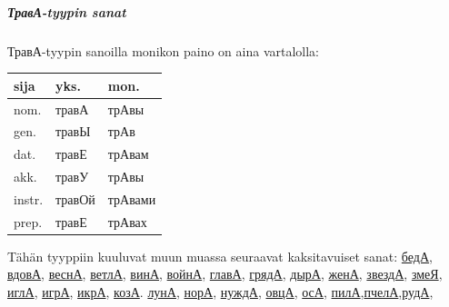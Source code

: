\documentclass[]{scrreprt}
\begin{document}
\subparagraph{ТравА-tyypin
sanat}\label{ux442ux440ux430ux432ux430-tyypin-sanat}

ТравА-tyypin sanoilla monikon paino on aina vartalolla:

\begin{longtable}[c]{@{}lll@{}}
\toprule
sija & yks. & mon.\tabularnewline
\midrule
\endhead
nom. & травА & трАвы\tabularnewline
gen. & травЫ & трАв\tabularnewline
dat. & травЕ & трАвам\tabularnewline
akk. & травУ & трАвы\tabularnewline
instr. & травОй & трАвами\tabularnewline
prep. & травЕ & трАвах\tabularnewline
\bottomrule
\end{longtable}

Tähän tyyppiin kuuluvat muun muassa seuraavat kaksitavuiset sanat:
\href{http://ru.wiktionary.org/wiki/\%D0\%B1\%D0\%B5\%D0\%B4\%D0\%B0}{бедА},
\href{http://ru.wiktionary.org/wiki/\%D0\%B2\%D0\%B4\%D0\%BE\%D0\%B2\%D0\%B0}{вдовА},
\href{http://ru.wiktionary.org/wiki/\%D0\%B2\%D0\%B5\%D1\%81\%D0\%BD\%D0\%B0}{веснА},
\href{http://ru.wiktionary.org/wiki/\%D0\%B2\%D0\%B5\%D1\%82\%D0\%BB\%D0\%B0}{ветлА},
\href{http://ru.wiktionary.org/wiki/\%D0\%B2\%D0\%B8\%D0\%BD\%D0\%B0}{винА},
\href{http://ru.wiktionary.org/wiki/\%D0\%B2\%D0\%BE\%D0\%B9\%D0\%BD\%D0\%B0}{войнА},
\href{http://ru.wiktionary.org/wiki/\%D0\%B3\%D0\%BB\%D0\%B0\%D0\%B2\%D0\%B0}{главА},
\href{http://ru.wiktionary.org/wiki/\%D0\%B3\%D1\%80\%D1\%8F\%D0\%B4\%D0\%B0}{грядА},
\href{http://ru.wiktionary.org/wiki/\%D0\%B4\%D1\%8B\%D1\%80\%D0\%B0}{дырА},
\href{http://ru.wiktionary.org/wiki/\%D0\%B6\%D0\%B5\%D0\%BD\%D0\%B0}{женА},
\href{http://ru.wiktionary.org/wiki/\%D0\%B7\%D0\%B2\%D0\%B5\%D0\%B7\%D0\%B4\%D0\%B0}{звездА},
\href{http://ru.wiktionary.org/wiki/\%D0\%B7\%D0\%BC\%D0\%B5\%D1\%8F}{змеЯ},
\href{http://ru.wiktionary.org/wiki/\%D0\%B8\%D0\%B3\%D0\%BB\%D0\%B0}{иглА},
\href{http://ru.wiktionary.org/wiki/\%D0\%B8\%D0\%B3\%D1\%80\%D0\%B0}{игрА},
\href{http://ru.wiktionary.org/wiki/\%D0\%B8\%D0\%BA\%D1\%80\%D0\%B0}{икрА},
\href{http://ru.wiktionary.org/wiki/\%D0\%BA\%D0\%BE\%D0\%B7\%D0\%B0}{козА}.
\href{http://ru.wiktionary.org/wiki/\%D0\%BB\%D1\%83\%D0\%BD\%D0\%B0}{лунА},
\href{http://ru.wiktionary.org/wiki/\%D0\%BD\%D0\%BE\%D1\%80\%D0\%B0}{норА},
\href{http://ru.wiktionary.org/wiki/\%D0\%BD\%D1\%83\%D0\%B6\%D0\%B4\%D0\%B0}{нуждА},
\href{http://ru.wiktionary.org/wiki/\%D0\%BE\%D0\%B2\%D1\%86\%D0\%B0}{овцА},
\href{http://ru.wiktionary.org/wiki/\%D0\%BE\%D1\%81\%D0\%B0}{осА},
\href{http://ru.wiktionary.org/wiki/\%D0\%BF\%D0\%B8\%D0\%BB\%D0\%B0}{пилА},\href{http://ru.wiktionary.org/wiki/\%D0\%BF\%D1\%87\%D0\%B5\%D0\%BB\%D0\%B0}{пчелА},\href{http://ru.wiktionary.org/wiki/\%D1\%80\%D1\%83\%D0\%B4\%D0\%B0}{рудА},
\end{document}
